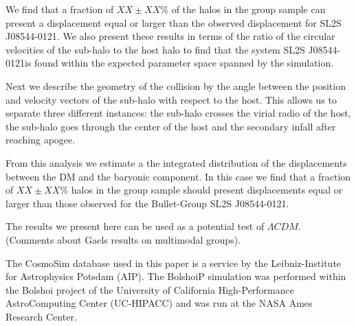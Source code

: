 \documentclass{emulateapj}
\newcommand{\bullg}{SL2S J08544-0121}
\begin{document}
We find that a fraction of $XX\pm XX\%$ of the halos in the group
sample can present a displacement equal or larger than the observed displacement
for \bullg. We also present these results in terms of the ratio of the
circular velocities of the sub-halo to the host halo to find that the
system \bullg is found within the expected parameter space spanned by
the simulation. 

Next we describe the geometry of the collision by the angle between
the position and velocity vectors of the sub-halo with respect to the
host. This allows us to separate three different instances: the
sub-halo crosses the virial radio of the host, the sub-halo goes
through the center of the host and the secondary
infall after reaching apogee. 

From this analysis we estimate a the integrated distribution of the
displacements between the DM and the baryonic component. In this case
we find that a fraction of $XX \pm XX\%$ halos in the group sample
should present displacements equal or larger than those observed for
the Bullet-Group \bullg. 

The results we present here can be used as a potential test of
$\Lambda CDM$. (Comments about Gaels results on multimodal groups).


The CosmoSim database used in this paper is a service by the
Leibniz-Institute for Astrophysics Potsdam (AIP). The  BolshoiP
simulation was performed within the Bolshoi project of the University
of California High-Performance  AstroComputing Center (UC-HIPACC) and
was run at the NASA Ames Research Center. 



 
\end{document}
